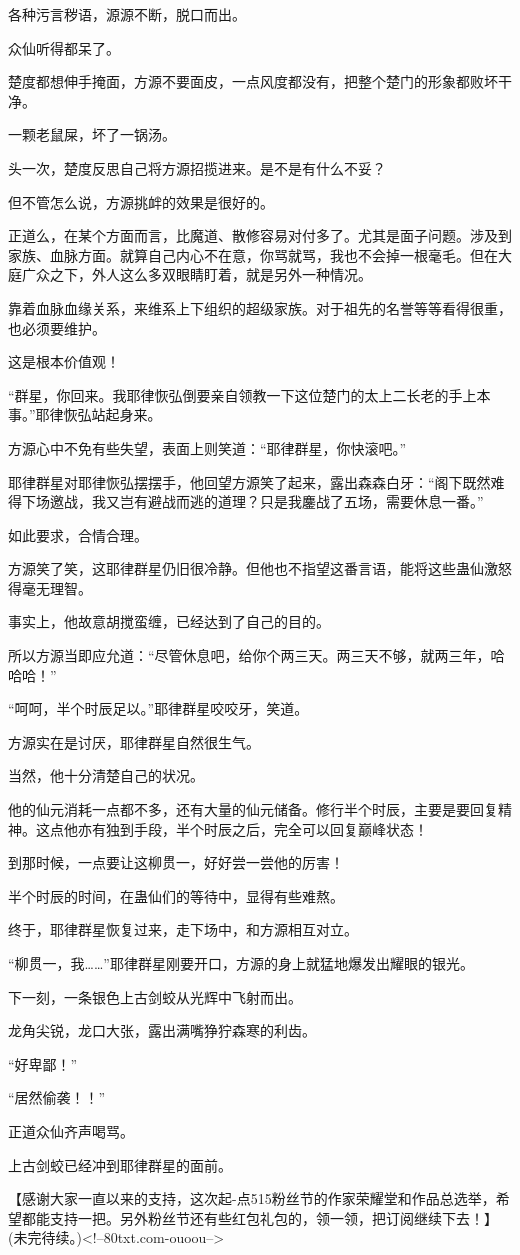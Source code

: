 \begin{this_body}
各种污言秽语，源源不断，脱口而出。

众仙听得都呆了。

楚度都想伸手掩面，方源不要面皮，一点风度都没有，把整个楚门的形象都败坏干净。

一颗老鼠屎，坏了一锅汤。

头一次，楚度反思自己将方源招揽进来。是不是有什么不妥？

但不管怎么说，方源挑衅的效果是很好的。

正道么，在某个方面而言，比魔道、散修容易对付多了。尤其是面子问题。涉及到家族、血脉方面。就算自己内心不在意，你骂就骂，我也不会掉一根毫毛。但在大庭广众之下，外人这么多双眼睛盯着，就是另外一种情况。

靠着血脉血缘关系，来维系上下组织的超级家族。对于祖先的名誉等等看得很重，也必须要维护。

这是根本价值观！

“群星，你回来。我耶律恢弘倒要亲自领教一下这位楚门的太上二长老的手上本事。”耶律恢弘站起身来。

方源心中不免有些失望，表面上则笑道：“耶律群星，你快滚吧。”

耶律群星对耶律恢弘摆摆手，他回望方源笑了起来，露出森森白牙：“阁下既然难得下场邀战，我又岂有避战而逃的道理？只是我鏖战了五场，需要休息一番。”

如此要求，合情合理。

方源笑了笑，这耶律群星仍旧很冷静。但他也不指望这番言语，能将这些蛊仙激怒得毫无理智。

事实上，他故意胡搅蛮缠，已经达到了自己的目的。

所以方源当即应允道：“尽管休息吧，给你个两三天。两三天不够，就两三年，哈哈哈！”

“呵呵，半个时辰足以。”耶律群星咬咬牙，笑道。

方源实在是讨厌，耶律群星自然很生气。

当然，他十分清楚自己的状况。

他的仙元消耗一点都不多，还有大量的仙元储备。修行半个时辰，主要是要回复精神。这点他亦有独到手段，半个时辰之后，完全可以回复巅峰状态！

到那时候，一点要让这柳贯一，好好尝一尝他的厉害！

半个时辰的时间，在蛊仙们的等待中，显得有些难熬。

终于，耶律群星恢复过来，走下场中，和方源相互对立。

“柳贯一，我……”耶律群星刚要开口，方源的身上就猛地爆发出耀眼的银光。

下一刻，一条银色上古剑蛟从光辉中飞射而出。

龙角尖锐，龙口大张，露出满嘴狰狞森寒的利齿。

“好卑鄙！”

“居然偷袭！！”

正道众仙齐声喝骂。

上古剑蛟已经冲到耶律群星的面前。

【感谢大家一直以来的支持，这次起-点515粉丝节的作家荣耀堂和作品总选举，希望都能支持一把。另外粉丝节还有些红包礼包的，领一领，把订阅继续下去！】(未完待续。)<!--80txt.com-ouoou-->

\end{this_body}

